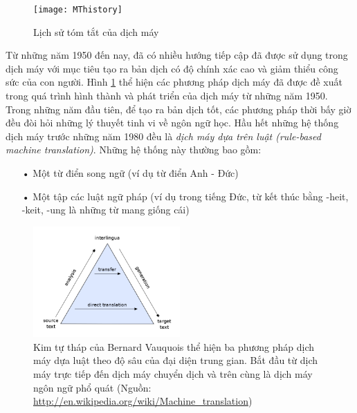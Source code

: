 \begin{figure}
	\centering
	\texttt{[image: MThistory]}
	\caption[Lịch sử tóm tắt của dịch máy]{Lịch sử tóm tắt của dịch máy} %
	\label{fig_mthistory}
\end{figure}

Từ những năm 1950 đến nay, đã có nhiều hướng tiếp cập đã được sử dụng trong dịch máy với mục tiêu tạo ra bản dịch có độ chính xác cao và giảm thiểu công sức của con người. Hình \ref{fig_mthistory} thể hiện các phương pháp dịch máy đã được đề xuất trong quá trình hình thành và phát triển của dịch máy từ những năm 1950. Trong những năm đầu tiên, để tạo ra bản dịch tốt, các phương pháp thời bấy giờ đều đòi hỏi những lý thuyết tinh vi về ngôn ngữ học. Hầu hết những hệ thống dịch máy trước những năm 1980 đều là \textit{dịch máy dựa trên luật (rule-based machine translation)}. Những hệ thống này thường bao gồm:
\begin{itemize}
	\item[•] Một từ điển song ngữ (ví dụ từ điển Anh - Đức)
	\item[•] Một tập các luật ngữ pháp (ví dụ trong tiếng Đức, từ kết thúc bằng -heit, -keit, -ung là những từ mang giống cái)		
\end{itemize} 

\begin{figure}
	\centering
	\includegraphics[width=0.5\textwidth]{rulebasedpyramid}
	\caption[Ba phương pháp dịch máy dựa trên luật]{Kim tự tháp của Bernard Vauquois thể hiện ba phương pháp dịch máy dựa luật theo độ sâu của đại diện trung gian. Bắt đầu từ dịch máy trực tiếp đến dịch máy chuyển dịch và trên cùng là dịch máy ngôn ngữ phổ quát (Nguồn: \href{http://en.wikipedia.org/wiki/Machine_translation}{http://en.wikipedia.org/wiki/Machine\_translation})}
	\label{fig_rulebasedpyramid}
\end{figure}

